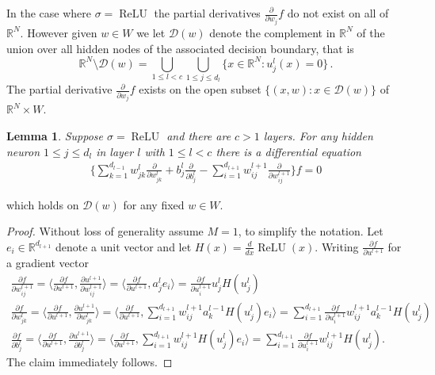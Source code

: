 \documentclass[11pt]{article}
\numberwithin{equation}{section}
\theoremstyle{plain}
\newtheorem{lemma}[theorem]{Lemma}
\theoremstyle{definition}
\begin{document}
In the case where $\sigma = \operatorname{ReLU}$ the partial derivatives $\frac{\partial}{\partial w_j} f$ do not exist on all of $\mathbb{R}^N$. However given $w \in W$ we let $\mathcal{D}(w)$ denote the complement in $\mathbb{R}^N$ of the union over all hidden nodes of the associated decision boundary, that is
\[
\mathbb{R}^N \setminus \mathcal{D}(w) = \bigcup_{1 \le l < c} \bigcup_{1 \le j \le d_l} \{ x \in \mathbb{R}^N : u^l_j(x) = 0 \}\,.
\]
The partial derivative $\frac{\partial}{\partial w_j} f$ exists on the open subset $\{ (x,w) : x \in \mathcal{D}(w) \}$ of $\mathbb{R}^N \times W$. 

\begin{lemma}\label{lemma:reln}
	Suppose $\sigma = \operatorname{ReLU}$ and there are $c > 1$ layers. For any hidden neuron $1 \le j \le d_l$ in layer $l$ with $1 \le l < c$ there is a differential equation
	\begin{align*}
		\Big\{ \sum_{k=1}^{d_{l-1}}w_{jk}^{l}\frac{\partial}{\partial w_{jk}^{l}} + b_{j}^{l}\frac{\partial}{\partial b_{j}^{l}}-\sum_{i=1}^{d_{l+1}}w_{ij}^{l+1}\frac{\partial}{\partial w_{ij}^{l+1}} \Big\} f =0
	\end{align*}
\end{lemma}
which holds on $\mathcal{D}(w)$ for any fixed $w \in W$.
\begin{proof}
	Without loss of generality assume $M = 1$, to simplify the notation. Let $e_{i}\in \mathbb{R}^{d_{l+1}}$ denote a unit vector and let $H(x)=\frac{d}{dx}\operatorname{ReLU}(x)$. Writing $\frac{\partial f}{\partial u^{l+1}}$ for a gradient vector
	\begin{gather*}
		\frac{\partial f}{\partial w_{ij}^{l+1}} = \Big\langle \frac{\partial f}{\partial u^{l+1}}, \frac{\partial u^{l+1}}{\partial w_{ij}^{l+1}} \Big\rangle = \Big\langle \frac{\partial f}{\partial u^{l+1}}, a_{j}^{l}e_{i} \Big\rangle =\frac{\partial f}{\partial u^{l+1}_i}u_{j}^{l}H(u_{j}^{l})\\
		\frac{\partial f}{\partial w_{jk}^{l}} =\Big\langle \frac{\partial f}{\partial u^{l+1}}, \frac{\partial u^{l+1}}{\partial w_{jk}^{l}} \Big\rangle = \Big\langle \frac{\partial f}{\partial u^{l+1}}, \sum_{i=1}^{d_{l+1}} w_{ij}^{l+1}a_{k}^{l-1}H(u_{j}^{l})e_{i} \Big\rangle = \sum_{i=1}^{d_{l+1}} \frac{\partial f}{\partial u^{l+1}_i}w_{ij}^{l+1}a_{k}^{l-1}H(u_{j}^{l}) \\
		\frac{\partial f}{\partial b_{j}^{l}} = \Big\langle \frac{\partial f}{\partial u^{l+1}}, \frac{\partial u^{l+1}}{\partial b_{j}^{l}} \Big\rangle =\Big\langle \frac{\partial f}{\partial u^{l+1}}, \sum_{i=1}^{d_{l+1}}w_{ij}^{l+1}H(u_{j}^{l})e_{i} \Big\rangle = \sum_{i=1}^{d_{l+1}} \frac{\partial f}{\partial u^{l+1}_i}w_{ij}^{l+1}H(u_{j}^{l}).
	\end{gather*}
	The claim immediately follows.
\end{proof}
\end{document}
